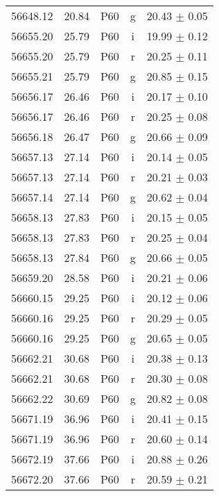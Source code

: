 \begin{tabular}{crccc}
    56648.12  &   20.84  &       P60  &   g  &     20.43 $\pm$ 0.05 \\
    56655.20  &   25.79  &       P60  &   i  &     19.99 $\pm$ 0.12 \\
    56655.20  &   25.79  &       P60  &   r  &     20.25 $\pm$ 0.11 \\
    56655.21  &   25.79  &       P60  &   g  &     20.85 $\pm$ 0.15 \\
    56656.17  &   26.46  &       P60  &   i  &     20.17 $\pm$ 0.10 \\
    56656.17  &   26.46  &       P60  &   r  &     20.25 $\pm$ 0.08 \\
    56656.18  &   26.47  &       P60  &   g  &     20.66 $\pm$ 0.09 \\
    56657.13  &   27.14  &       P60  &   i  &     20.14 $\pm$ 0.05 \\
    56657.13  &   27.14  &       P60  &   r  &     20.21 $\pm$ 0.03 \\
    56657.14  &   27.14  &       P60  &   g  &     20.62 $\pm$ 0.04 \\
    56658.13  &   27.83  &       P60  &   i  &     20.15 $\pm$ 0.05 \\
    56658.13  &   27.83  &       P60  &   r  &     20.25 $\pm$ 0.04 \\
    56658.13  &   27.84  &       P60  &   g  &     20.66 $\pm$ 0.05 \\
    56659.20  &   28.58  &       P60  &   i  &     20.21 $\pm$ 0.06 \\
    56660.15  &   29.25  &       P60  &   i  &     20.12 $\pm$ 0.06 \\
    56660.16  &   29.25  &       P60  &   r  &     20.29 $\pm$ 0.05 \\
    56660.16  &   29.25  &       P60  &   g  &     20.65 $\pm$ 0.05 \\
    56662.21  &   30.68  &       P60  &   i  &     20.38 $\pm$ 0.13 \\
    56662.21  &   30.68  &       P60  &   r  &     20.30 $\pm$ 0.08 \\
    56662.22  &   30.69  &       P60  &   g  &     20.82 $\pm$ 0.08 \\
    56671.19  &   36.96  &       P60  &   i  &     20.41 $\pm$ 0.15 \\
    56671.19  &   36.96  &       P60  &   r  &     20.60 $\pm$ 0.14 \\
    56672.19  &   37.66  &       P60  &   i  &     20.88 $\pm$ 0.26 \\
    56672.20  &   37.66  &       P60  &   r  &     20.59 $\pm$ 0.21 \\

\end{tabular}
